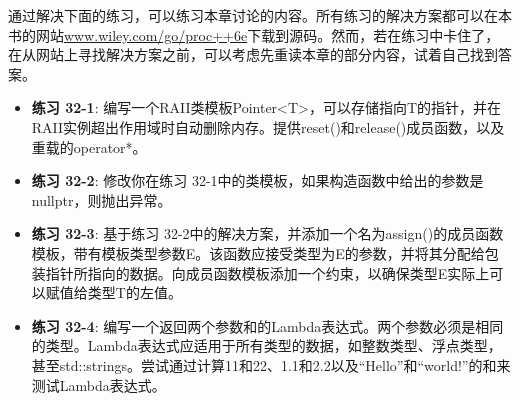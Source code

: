 通过解决下面的练习，可以练习本章讨论的内容。所有练习的解决方案都可以在本书的网站\url{www.wiley.com/go/proc++6e}下载到源码。然而，若在练习中卡住了，在从网站上寻找解决方案之前，可以考虑先重读本章的部分内容，试着自己找到答案。

\begin{itemize}
\item
\textbf{练习 32-1}: 编写一个RAII类模板Pointer<T>，可以存储指向T的指针，并在RAII实例超出作用域时自动删除内存。提供reset()和release()成员函数，以及重载的operator*。

\item
\textbf{练习 32-2}: 修改你在练习 32-1中的类模板，如果构造函数中给出的参数是nullptr，则抛出异常。

\item
\textbf{练习 32-3}: 基于练习 32-2中的解决方案，并添加一个名为assign()的成员函数模板，带有模板类型参数E。该函数应接受类型为E的参数，并将其分配给包装指针所指向的数据。向成员函数模板添加一个约束，以确保类型E实际上可以赋值给类型T的左值。

\item
\textbf{练习 32-4}: 编写一个返回两个参数和的Lambda表达式。两个参数必须是相同的类型。Lambda表达式应适用于所有类型的数据，如整数类型、浮点类型，甚至std::strings。尝试通过计算11和22、1.1和2.2以及“Hello”和“world!”的和来测试Lambda表达式。
\end{itemize}
